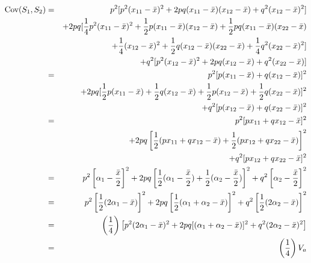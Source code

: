 \documentclass[12pt]{article}
\newcommand{\Cov}{\mbox{Cov}}
\begin{document}
\begin{eqnarray*}
\Cov(S_1,S_2) &=& p^2[p^2(x_{11} - {\bar x})^2 + 2pq(x_{11} - {\bar x})
                                                (x_{12} - {\bar x})
                                           + q^2(x_{12} - {\bar x})^2] \\
             &&+ 2pq[{1 \over 4}p^2(x_{11} - {\bar x})^2
                  + {1 \over 2}p(x_{11} - {\bar x})(x_{12} - {\bar x})
                  + {1 \over 2}pq(x_{11} - {\bar x})(x_{22} - {\bar x}) \\
             &&\ \ + {1 \over 4}(x_{12} - {\bar x})^2
                  + {1 \over 2}q(x_{12} - {\bar x})(x_{22} - {\bar x})
                  + {1 \over 4}q^2(x_{22} - {\bar x})^2] \\
             &&+ q^2[p^2(x_{12} - {\bar x})^2 + 2pq(x_{12} - {\bar x})
                                                 + q^2(x_{22} - {\bar
                                                x})] \\
   &=&\ p^2[p(x_{11} - {\bar x}) + q(x_{12} - {\bar x})]^2 \\
   &&+ 2pq[{1 \over 2}p(x_{11} - {\bar x}) + 
         {1 \over 2}q(x_{12} - {\bar x}) +
         {1 \over 2}p(x_{12} - {\bar x}) +
         {1 \over 2}q(x_{22} - {\bar x})]^2 \\
   &&+ q^2[p(x_{12} - {\bar x}) + q(x_{22} - {\bar x})]^2 \\
   &=&\ p^2[px_{11} + qx_{12} - {\bar x}]^2 \\
   &&+ 2pq\left[{1 \over 2}(px_{11} + qx_{12} - {\bar x}) +
         {1 \over 2}(px_{12} + qx_{22} - {\bar x})\right]^2 \\
   &&+ q^2[px_{12} + qx_{22} - {\bar x}]^2 \\
   &=&\ p^2\left[\alpha_1 - {{\bar x} \over 2}\right]^2
   + 2pq\left[{1 \over 2}(\alpha_1 - {{\bar x} \over 2}) +
         {1 \over 2}(\alpha_2 - {{\bar x} \over 2})\right]^2
   + q^2\left[\alpha_2 - {{\bar x} \over 2}\right]^2 \\
   &=&\ p^2\left[{1 \over 2}(2\alpha_1 - {\bar x})\right]^2 
   + 2pq\left[{1 \over 2}(\alpha_1 + \alpha_2 - {\bar x})\right]^2 
        + q^2\left[{1 \over 2}(2\alpha_2 - {\bar x})\right]^2 \\
   &=& \left({1 \over 4}\right)
      \left[p^2(2\alpha_1 - {\bar x})^2 
        + 2pq[(\alpha_1+\alpha_2 - {\bar x})]^2
        + q^2(2\alpha_2 - {\bar x})^2\right] \\
   &=& \left({1 \over 4}\right)V_a
\end{eqnarray*}
\end{document}
